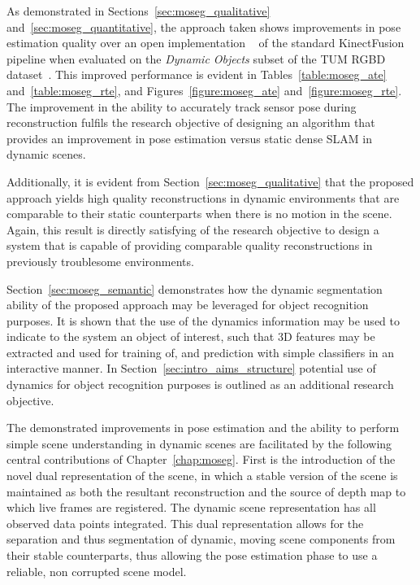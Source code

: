 As demonstrated in Sections~\ref{sec:moseg_qualitative} and~\ref{sec:moseg_quantitative}, the 
approach taken shows improvements in pose estimation quality over an open implementation
~\cite{Prisacariu2014} of the standard KinectFusion~\cite{Newcombe2011} pipeline when evaluated 
on the \textit{Dynamic Objects} subset of the TUM RGBD dataset~\cite{Sturm2012}. This improved 
performance is evident in Tables~\ref{table:moseg_ate} and~\ref{table:moseg_rte}, and 
Figures~\ref{figure:moseg_ate} and~\ref{figure:moseg_rte}. The improvement in the ability to 
accurately track sensor pose during reconstruction fulfils the research objective of designing 
an algorithm that provides an improvement in pose estimation versus static dense SLAM in dynamic 
scenes.

Additionally, it is evident from Section~\ref{sec:moseg_qualitative} that the proposed approach 
yields high quality reconstructions in dynamic environments that are comparable to their static 
counterparts when there is no motion in the scene. Again, this result is directly satisfying of 
the research objective to design a system that is capable of providing comparable quality 
reconstructions in previously troublesome environments.

Section~\ref{sec:moseg_semantic} demonstrates how the dynamic segmentation ability of the proposed 
approach may be leveraged for object recognition purposes. It is shown that the use of the dynamics 
information may be used to indicate to the system an object of interest, such that 3D features may be 
extracted and used for training of, and prediction with simple classifiers in an interactive manner. In 
Section~\ref{sec:intro_aims_structure} potential use of dynamics for object recognition purposes is outlined 
as an additional research objective.

The demonstrated improvements in pose estimation and the ability to perform simple scene 
understanding in dynamic scenes are facilitated by the following central contributions of 
Chapter~\ref{chap:moseg}. First is the introduction of the novel dual representation of 
the scene, in which a stable version of the scene is maintained as both the resultant 
reconstruction and the source of depth map to which live frames are registered. The 
dynamic scene representation has all observed data points integrated. This dual 
representation allows for the separation and thus segmentation of dynamic, moving scene components 
from their stable counterparts, thus allowing the pose estimation phase to use a reliable, non 
corrupted scene model.

